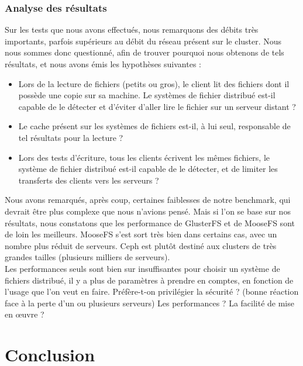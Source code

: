 \documentclass[12pt]{report}
\begin{document}
			\subsection{Analyse des résultats}

			Sur les tests que nous avons effectués, nous remarquons des débits très importants, parfois supérieurs au débit du réseau présent sur le cluster.
			Nous nous sommes donc questionné, afin de trouver pourquoi nous obtenons de tels résultats, et nous avons émis les hypothèses suivantes :
			\begin{itemize}
				\item Lors de la lecture de fichiers (petits ou gros), le client lit des fichiers dont il possède une copie sur sa machine.
				Le systèmes de fichier distribué est-il capable de le détecter et d'éviter d'aller lire le fichier sur un serveur distant ?
				\item Le cache présent sur les systèmes de fichiers est-il, à lui seul, responsable de tel résultats pour la lecture ?
				\item Lors des tests d'écriture, tous les clients écrivent les mêmes fichiers, le système de fichier distribué est-il capable de le détecter, et de limiter les transferts des clients vers les serveurs ?\\
			\end{itemize}

			Nous avons remarqués, après coup, certaines faiblesses de notre benchmark, qui devrait être plus complexe que nous n'avions pensé.
			Mais si l'on se base sur nos résultats, nous constatons que les performance de GlusterFS et de MooseFS sont de loin les meilleurs. MooseFS s'est sort très bien dans certains cas, avec un nombre plus réduit de serveurs. Ceph est plutôt destiné aux clusters de très grandes tailles (plusieurs milliers de serveurs).\\

			Les performances seuls sont bien sur insuffisantes pour choisir un système de fichiers distribué, il y a plus de paramètres à prendre en comptes, en fonction de l'usage que l'on veut en faire. 
			Préfère-t-on privilégier la sécurité ? (bonne réaction face à la perte d'un ou plusieurs serveurs)
			Les performances ? La facilité de mise en œuvre ?

	\chapter{Conclusion}
\end{document}
